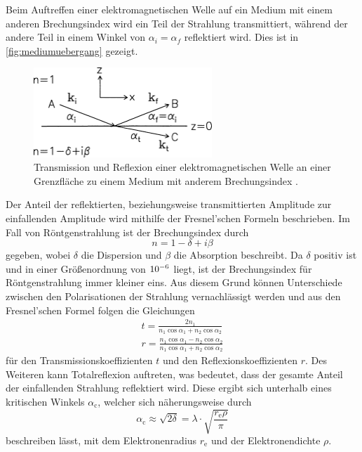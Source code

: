 Beim Auftreffen einer elektromagnetischen Welle auf ein Medium mit einem anderen Brechungsindex wird ein Teil der Strahlung transmittiert,
während der andere Teil in einem Winkel von $\alpha_i = \alpha_f$ reflektiert wird.
Dies ist in \autoref{fig:mediumuebergang} gezeigt.
\begin{figure}
    \centering
    \includegraphics[width=0.6\textwidth]{content/img/Tolan_2.1.png}
    \caption{Transmission und Reflexion einer elektromagnetischen Welle an einer Grenzfläche zu einem Medium mit anderem Brechungsindex \cite{tolan}.}
    \label{fig:mediumuebergang}
\end{figure}
Der Anteil der reflektierten,
beziehungsweise transmittierten Amplitude zur einfallenden Amplitude wird mithilfe der Fresnel'schen Formeln beschrieben.
Im Fall von Röntgenstrahlung ist der Brechungsindex durch
\begin{equation}
    n = 1 - \delta + i \beta 
    \label{eqn:brechungsindex}
\end{equation}
gegeben,
wobei $\delta$ die Dispersion und $\beta$ die Absorption beschreibt.
Da $\delta$ positiv ist und in einer Größenordnung von $\num{e{-6}}$ liegt,
ist der Brechungsindex für Röntgenstrahlung immer kleiner eins.
Aus diesem Grund können Unterschiede zwischen den Polarisationen der Strahlung vernachlässigt werden und aus den Fresnel'schen Formel folgen die Gleichungen
\begin{gather}
    t = \frac{2n_1}{n_1 \cos{\alpha_1} + n_2 \cos{\alpha_2}} \\
    r = \frac{n_1 \cos{\alpha_1} - n_2 \cos{\alpha_2}}{n_1 \cos{\alpha_1} + n_2 \cos{\alpha_2}}
\end{gather}
für den Transmissionskoeffizienten $t$ und den Reflexionskoeffizienten $r$.
Des Weiteren kann Totalreflexion auftreten,
was bedeutet,
dass der gesamte Anteil der einfallenden Strahlung reflektiert wird.
Diese ergibt sich unterhalb eines kritischen Winkels $\alpha_\text{c}$,
welcher sich näherungsweise durch 
\begin{equation}
    \alpha_\text{c} \approx \sqrt{2 \delta} = \lambda \cdot \sqrt{\frac{r_\text{e} \rho}{\pi}}
\end{equation}
beschreiben lässt,
mit dem Elektronenradius $r_\text{e}$ und der Elektronendichte $\rho$.

